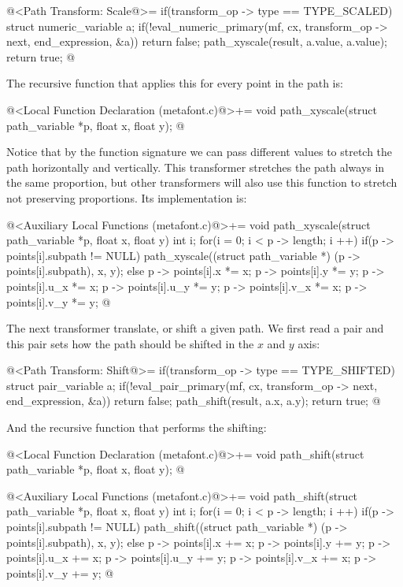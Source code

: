 \iniciocodigo
@<Path Transform: Scale@>=
if(transform_op -> type == TYPE_SCALED){
  struct numeric_variable a;
  if(!eval_numeric_primary(mf, cx, transform_op -> next, end_expression,
                          &a))
    return false;
  path_xyscale(result, a.value, a.value);  
  return true;
}
@
\fimcodigo

The recursive function that applies this for every point in the path
is:

\iniciocodigo
@<Local Function Declaration (metafont.c)@>+=
void path_xyscale(struct path_variable *p, float x, float y);
@
\fimcodigo

Notice that by the function signature we can pass different values to
stretch the path horizontally and vertically. This transformer
stretches the path always in the same proportion, but other
transformers will also use this function to stretch not preserving
proportions. Its implementation is:

\iniciocodigo
@<Auxiliary Local Functions (metafont.c)@>+=
void path_xyscale(struct path_variable *p, float x, float y){
  int i;
  for(i = 0; i < p -> length; i ++){
    if(p -> points[i].subpath != NULL)
      path_xyscale((struct path_variable *) (p -> points[i].subpath), x,
                   y);
    else{
      p -> points[i].x *= x;
      p -> points[i].y *= y;
      p -> points[i].u_x *= x;
      p -> points[i].u_y *= y;
      p -> points[i].v_x *= x;
      p -> points[i].v_y *= y;
    }
  }
}
@
\fimcodigo

The next transformer translate, or shift a given path. We first read a
pair and this pair sets how the path should be shifted in the $x$ and
$y$ axis:

\iniciocodigo
@<Path Transform: Shift@>=
if(transform_op -> type == TYPE_SHIFTED){
  struct pair_variable a;
  if(!eval_pair_primary(mf, cx, transform_op -> next, end_expression,
                          &a))
    return false;
  path_shift(result, a.x, a.y);  
  return true;
}
@
\fimcodigo

And the recursive function that performs the shifting:

\iniciocodigo
@<Local Function Declaration (metafont.c)@>+=
void path_shift(struct path_variable *p, float x, float y);
@
\fimcodigo

\iniciocodigo
@<Auxiliary Local Functions (metafont.c)@>+=
void path_shift(struct path_variable *p, float x, float y){
  int i;
  for(i = 0; i < p -> length; i ++){
    if(p -> points[i].subpath != NULL)
      path_shift((struct path_variable *) (p -> points[i].subpath), x, y);
    else{
      p -> points[i].x += x;
      p -> points[i].y += y;
      p -> points[i].u_x += x;
      p -> points[i].u_y += y;
      p -> points[i].v_x += x;
      p -> points[i].v_y += y;
    }
  }
}
@
\fimcodigo

